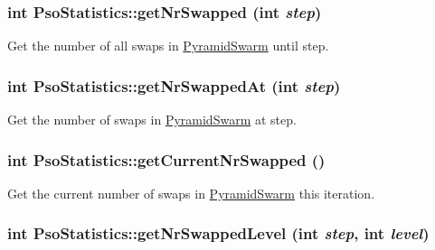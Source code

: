 \hypertarget{classPsoStatistics_891f35f4f6e8a29f47b4e8537ba23e4b}{
\subsubsection{\setlength{\rightskip}{0pt plus 5cm}int PsoStatistics::getNrSwapped (int {\em step})}}
\label{classPsoStatistics_891f35f4f6e8a29f47b4e8537ba23e4b}


Get the number of all swaps in \hyperlink{classPyramidSwarm}{PyramidSwarm} until step. 

\hypertarget{classPsoStatistics_fbff3218d9cf6a42ba38ac14d9c92fdd}{
\subsubsection{\setlength{\rightskip}{0pt plus 5cm}int PsoStatistics::getNrSwappedAt (int {\em step})}}
\label{classPsoStatistics_fbff3218d9cf6a42ba38ac14d9c92fdd}


Get the number of swaps in \hyperlink{classPyramidSwarm}{PyramidSwarm} at step. 

\hypertarget{classPsoStatistics_b40a0814c7489543ab403ca96deefbf8}{
\subsubsection{\setlength{\rightskip}{0pt plus 5cm}int PsoStatistics::getCurrentNrSwapped ()}}
\label{classPsoStatistics_b40a0814c7489543ab403ca96deefbf8}


Get the current number of swaps in \hyperlink{classPyramidSwarm}{PyramidSwarm} this iteration. 

\hypertarget{classPsoStatistics_510212cbbf51016b23b7fa5137da665d}{
\subsubsection{\setlength{\rightskip}{0pt plus 5cm}int PsoStatistics::getNrSwappedLevel (int {\em step}, \/  int {\em level})}}
\label{classPsoStatistics_510212cbbf51016b23b7fa5137da665d}


